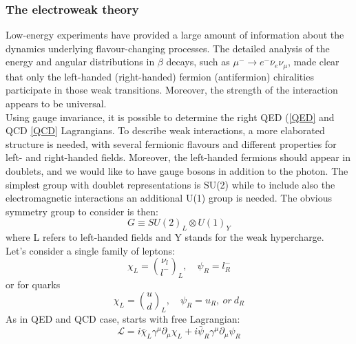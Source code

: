 \subsubsection{The electroweak theory}
Low-energy experiments have provided a large amount of information about the dynamics underlying flavour-changing processes. The detailed analysis of the energy and angular distributions in $\beta$ decays, such as $\mu^{-} \to e^{-}\bar{\nu}_{e}\nu_{\mu}$, made clear that only the left-handed (right-handed) fermion (antifermion) chiralities participate in those weak transitions. Moreover, the strength of the interaction appears to be universal. \\
Using gauge invariance, it is possible to determine the right QED (\ref{QED} and QCD \ref{QCD} Lagrangians. To describe weak interactions, a more elaborated structure is needed, with several fermionic flavours and different properties for left- and right-handed fields. Moreover, the left-handed fermions should appear in doublets, and we would like to have gauge bosons in addition to the photon. The simplest group with doublet representations is SU(2) while to include also the electromagnetic interactions an additional U(1) group is needed. The obvious symmetry group to consider is then:
\begin{equation}
G \equiv SU(2)_{L} \otimes U(1)_{Y}
\label{EWK_group}
\end{equation}
where L refers to left-handed fields and Y stands for the weak hypercharge. \\
Let's consider a single family of leptons:
\begin{equation}
\chi_{L} =  {\nu_{l} \choose l^{-}}_{L}, \quad \psi_{R} = l^{-}_{R}
\label{EWK_Singlet_doublet_Leptons}
\end{equation}
or for quarks
\begin{equation}
\chi_{L} =  {u \choose d}_{L} , \quad \psi_{R} = u_{R},\ or\ d_{R}
\label{EWK_Singlet_doublet_Leptons}
\end{equation}
As in QED and QCD case, starts with free Lagrangian:
\begin{equation}
\mathcal{L} = i\bar{\chi}_{L}\gamma^{\mu}\partial_{\mu}\chi_{L} + i\bar{\psi}_{R}\gamma^{\mu}\partial_{\mu}\psi_{R}
\label{L0_EWK}
\end{equation}
